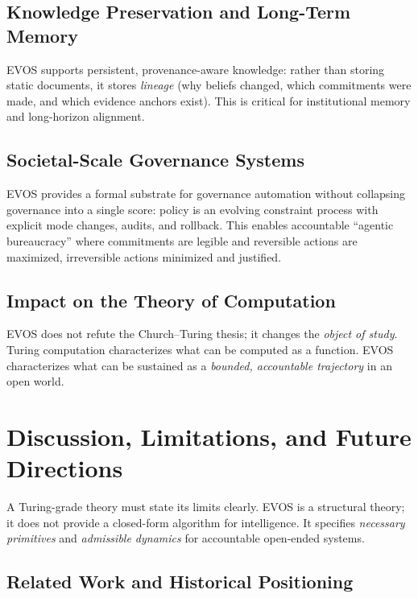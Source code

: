\documentclass[11pt]{article}
\begin{document}
\subsection{Knowledge Preservation and Long-Term Memory}
\label{sec:app-memory}

EVOS supports persistent, provenance-aware knowledge: rather than storing static documents, it
stores \emph{lineage} (why beliefs changed, which commitments were made, and which evidence anchors exist).
This is critical for institutional memory and long-horizon alignment.

\subsection{Societal-Scale Governance Systems}
\label{sec:app-governance}

EVOS provides a formal substrate for governance automation without collapsing governance into
a single score: policy is an evolving constraint process with explicit mode changes, audits,
and rollback. This enables accountable ``agentic bureaucracy'' where commitments are legible
and reversible actions are maximized, irreversible actions minimized and justified.

\subsection{Impact on the Theory of Computation}
\label{sec:impact-toc}

EVOS does not refute the Church--Turing thesis; it changes the \emph{object of study}.
Turing computation characterizes what can be computed as a function. EVOS characterizes what
can be sustained as a \emph{bounded, accountable trajectory} in an open world.


\section{Discussion, Limitations, and Future Directions}
\label{sec:discussion}

A Turing-grade theory must state its limits clearly. EVOS is a structural theory; it does not
provide a closed-form algorithm for intelligence. It specifies \emph{necessary primitives} and
\emph{admissible dynamics} for accountable open-ended systems.

\subsection{Related Work and Historical Positioning}
\end{document}
